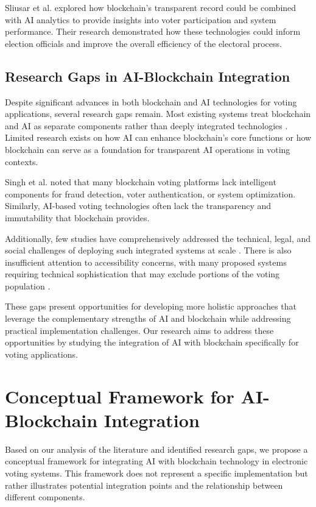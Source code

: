 \documentclass[conference]{IEEEtran}
\begin{document}
Sliusar et al. \cite{b4} explored how blockchain's transparent record could be combined with AI analytics to provide insights into voter participation and system performance. Their research demonstrated how these technologies could inform election officials and improve the overall efficiency of the electoral process.

\subsection{Research Gaps in AI-Blockchain Integration}
Despite significant advances in both blockchain and AI technologies for voting applications, several research gaps remain. Most existing systems treat blockchain and AI as separate components rather than deeply integrated technologies \cite{b4}. Limited research exists on how AI can enhance blockchain's core functions or how blockchain can serve as a foundation for transparent AI operations in voting contexts.

Singh et al. \cite{b5} noted that many blockchain voting platforms lack intelligent components for fraud detection, voter authentication, or system optimization. Similarly, AI-based voting technologies often lack the transparency and immutability that blockchain provides.

Additionally, few studies have comprehensively addressed the technical, legal, and social challenges of deploying such integrated systems at scale \cite{b7}. There is also insufficient attention to accessibility concerns, with many proposed systems requiring technical sophistication that may exclude portions of the voting population \cite{b6}.

These gaps present opportunities for developing more holistic approaches that leverage the complementary strengths of AI and blockchain while addressing practical implementation challenges. Our research aims to address these opportunities by studying the integration of AI with blockchain specifically for voting applications.

\section{Conceptual Framework for AI-Blockchain Integration}
Based on our analysis of the literature and identified research gaps, we propose a conceptual framework for integrating AI with blockchain technology in electronic voting systems. This framework does not represent a specific implementation but rather illustrates potential integration points and the relationship between different components.
\end{document}
